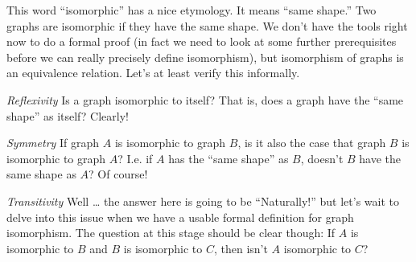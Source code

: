 \documentclass[10pt,]{book}
\theoremstyle{plain}
\theoremstyle{definition}
\theoremstyle{definition}
\numberwithin{equation}{section}
\begin{document}
    This word ``isomorphic'' has a nice etymology. It means ``same shape.'' Two graphs are
    isomorphic if they have the same shape. We don't have the tools right now to do a formal
    proof (in fact we need to look at some further prerequisites before we can really precisely
    define isomorphism), but isomorphism of graphs is an equivalence relation. Let's at least
    verify this informally.
\par

    \emph{Reflexivity} Is a graph isomorphic to itself? That is, does a graph have the ``same
    shape'' as itself? Clearly!
\par

    \emph{Symmetry} If graph \(A\) is isomorphic to graph \(B\), is it also the case that graph \(B\)
    is isomorphic to graph \(A\)? I.e. if \(A\) has the ``same shape'' as \(B\), doesn't \(B\) have the
    same shape as \(A\)? Of course!
\par

    \emph{Transitivity} Well \dots{} the answer here is going to be ``Naturally!'' but let's wait
    to delve into this issue when we have a usable formal definition for graph isomorphism. The
    question at this stage should be clear though: If \(A\) is isomorphic to \(B\) and \(B\) is isomorphic
    to \(C\), then isn't \(A\) isomorphic to \(C\)?
\typeout{************************************************}
\typeout{************************************************}
\end{document}
